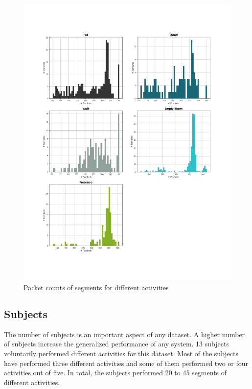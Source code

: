 \begin{figure}[H]
\centering
\includegraphics[width=1.0\textwidth, trim={0 6cm 0 4cm},clip]{./figure/chap 4/activity_data_sizes.png}
\caption{Packet counts of segments for different activities}
\label{Fig 4.9}
\end{figure}

\subsection{Subjects}
The number of subjects is an important aspect of any dataset. A higher number of subjects increase the generalized performance of any system. 13 subjects voluntarily performed different activities for this dataset. Most of the subjects have performed three different activities and some of them performed two or four activities out of five. In total, the subjects performed 20 to 45 segments of different activities.

